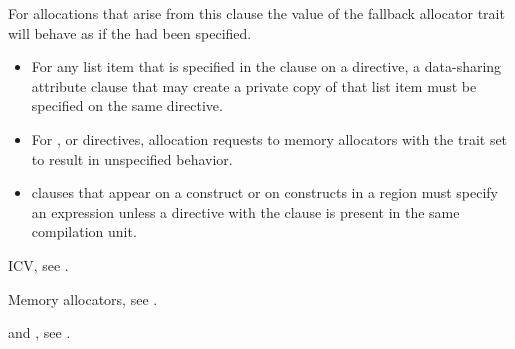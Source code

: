For allocations that arise from this clause the  value of the 
fallback allocator trait will behave as if the  had been specified.

\restrictions
\begin{itemize}
\item For any list item that is specified in the  clause on a 
      directive, a data-sharing attribute clause that may create a private copy 
      of that list item must be specified on the same directive.
\item For ,  or  directives, allocation 
      requests to memory allocators with the trait  set to 
       result in unspecified behavior.
\item {} clauses that appear on a  construct or on
      constructs in a  region must specify an  
      expression unless a  directive with the 
      clause is present in the same compilation unit.
\end{itemize}

\begin{crossrefs}
\item {} ICV, see .

\item Memory allocators, see .

\item {} and , 
see .
\end{crossrefs}
